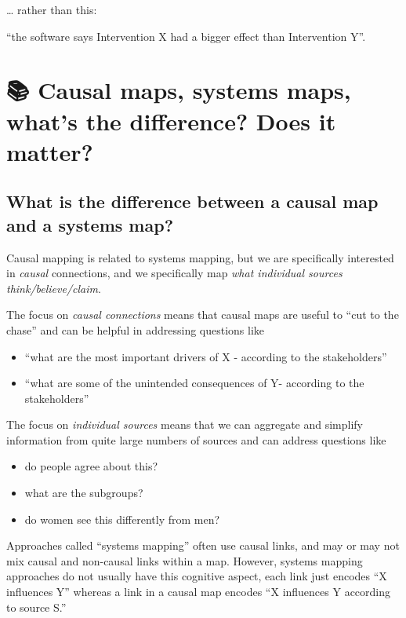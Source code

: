 \documentclass[
]{book}
\begin{document}
\ldots{} rather than this:

``the software says Intervention X had a bigger effect than Intervention Y''.

\hypertarget{causal-maps-systems-maps-whats-the-difference-does-it-matter}{%
\chapter{📚 Causal maps, systems maps, what's the difference? Does it matter?}\label{causal-maps-systems-maps-whats-the-difference-does-it-matter}}

\hypertarget{what-is-the-difference-between-a-causal-map-and-a-systems-map}{%
\section{What is the difference between a causal map and a systems map?}\label{what-is-the-difference-between-a-causal-map-and-a-systems-map}}

Causal mapping is related to systems mapping, but we are specifically interested in \emph{causal} connections, and we specifically map \emph{what individual sources think/believe/claim}.

The focus on \emph{causal connections} means that causal maps are useful to ``cut to the chase'' and can be helpful in addressing questions like

\begin{itemize}
\item
  ``what are the most important drivers of X - according to the stakeholders''
\item
  ``what are some of the unintended consequences of Y- according to the stakeholders''
\end{itemize}

The focus on \emph{individual sources} means that we can aggregate and simplify information from quite large numbers of sources and can address questions like

\begin{itemize}
\item
  do people agree about this?
\item
  what are the subgroups?
\item
  do women see this differently from men?
\end{itemize}

Approaches called ``systems mapping'' often use causal links, and may or may not mix causal and non-causal links within a map. However, systems mapping approaches do not usually have this cognitive aspect, each link just encodes ``X influences Y'' whereas a link in a causal map encodes ``X influences Y according to source S.''
\end{document}
